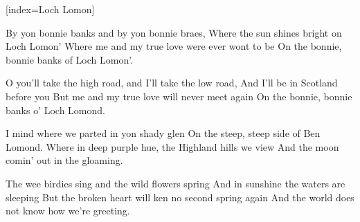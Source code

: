 [index={Loch Lomon}]

\beginverse
By yon bonnie banks and by yon bonnie braes,
Where the sun shines bright on Loch Lomon'
Where me and my true love were ever wont to be
On the bonnie, bonnie banks of Loch Lomon'.
\endverse

\beginchorus
O you’ll take the high road, and I’ll take the low road,
And I’ll be in Scotland before you
But me and my true love will never meet again
On the bonnie, bonnie banks o’ Loch Lomond.
\endchorus

\beginverse
I mind where we parted in yon shady glen
On the steep, steep side of Ben Lomond.
Where in deep purple hue, the Highland hills we view
And the moon comin’ out in the gloaming.
\endverse

\beginverse
The wee birdies sing and the wild flowers spring
And in sunshine the waters are sleeping
But the broken heart will ken no second spring again
And the world does not know how we're greeting. 
\endverse

\endsong
